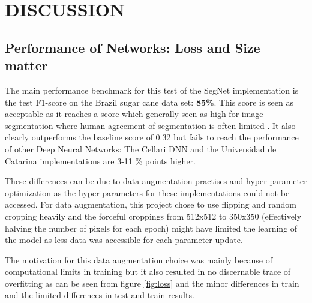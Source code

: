 \documentclass{article}
\begin{document}





%

\vspace*{-.5cm}

\section{DISCUSSION}

\subsection{Performance of Networks: Loss and Size matter}
The main performance benchmark for this test of the SegNet implementation is the test F1-score on the Brazil sugar cane data set: \textbf{85\%}.
This score is seen as acceptable as it reaches a score which generally seen as high for image segmentation where human agreement of segmentation is often limited \cite{eval}.  It also clearly outperforms the baseline score of 0.32 but fails to reach the performance of other Deep Neural Networks: The Cellari DNN and the Universidad de Catarina implementations are 3-11 \% points higher. 

These differences can be due to data augmentation practises and hyper parameter optimization as the hyper parameters for these implementations could not be accessed.
For data augmentation, this project chose to use flipping and random cropping heavily and the forceful croppings from 512x512 to 350x350 (effectively halving the number of pixels for each epoch) might have limited the learning of the model as less data was accessible for each parameter update. 

The motivation for this data augmentation choice was mainly because of computational limits in training but it also resulted in no discernable trace of overfitting as can be seen from figure \ref{fig:loss} and the minor differences in train and the limited differences in test and train results.
\end{document}
